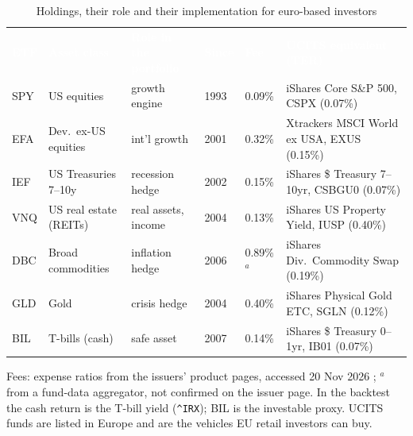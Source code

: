 \begin{table}[!htb]
\centering\footnotesize\setlength{\tabcolsep}{4pt}
\caption{Holdings, their role and their implementation for euro-based investors}\label{tab:holdings}
\begin{threeparttable}
\begin{tabularx}{\textwidth}{lllllX}
\toprule
\rowcolor{fmdark}\textcolor{white}{\textbf{ETF}} & \textcolor{white}{\textbf{Asset class}} & \textcolor{white}{\textbf{Role in the portfolio}} & \textcolor{white}{\textbf{Since}} & \textcolor{white}{\textbf{Fee}} & \textcolor{white}{\textbf{UCITS equivalent (TER)}}\\
SPY & US equities & growth engine & 1993 & 0.09\% & iShares Core S\&P 500, CSPX (0.07\%)\\
EFA & Dev.\ ex-US equities & int'l growth & 2001 & 0.32\% & Xtrackers MSCI World ex USA, EXUS (0.15\%)\\
IEF & US Treasuries 7--10y & recession hedge & 2002 & 0.15\% & iShares \$ Treasury 7--10yr, CSBGU0 (0.07\%)\\
VNQ & US real estate (REITs) & real assets, income & 2004 & 0.13\% & iShares US Property Yield, IUSP (0.40\%)\\
DBC & Broad commodities & inflation hedge & 2006 & 0.89\%$^a$ & iShares Div.\ Commodity Swap (0.19\%)\\
GLD & Gold & crisis hedge & 2004 & 0.40\% & iShares Physical Gold ETC, SGLN (0.12\%)\\
BIL & T-bills (cash) & safe asset & 2007 & 0.14\% & iShares \$ Treasury 0--1yr, IB01 (0.07\%)\\
\bottomrule
\end{tabularx}
\begin{tablenotes}\footnotesize
\item Fees: expense ratios from the issuers' product pages, accessed 20 Nov 2026 \citep{issuers2026}; $^a$ from a fund-data aggregator,
not confirmed on the issuer page. In the backtest the cash return is the T-bill yield (\texttt{\textasciicircum IRX}); BIL is the
investable proxy. UCITS funds are listed in Europe and are the vehicles EU retail investors can buy.
\end{tablenotes}
\end{threeparttable}
\end{table}
